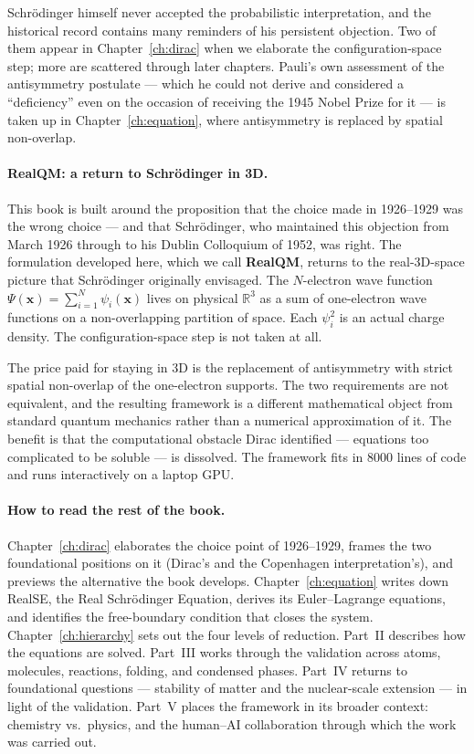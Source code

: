 Schr\"odinger himself never accepted the probabilistic interpretation, and the historical record contains many reminders of his persistent objection. Two of them appear in Chapter~\ref{ch:dirac} when we elaborate the configuration-space step; more are scattered through later chapters. Pauli's own assessment of the antisymmetry postulate --- which he could not derive and considered a ``deficiency'' even on the occasion of receiving the 1945 Nobel Prize for it --- is taken up in Chapter~\ref{ch:equation}, where antisymmetry is replaced by spatial non-overlap.

\paragraph{RealQM: a return to Schr\"odinger in 3D.}
This book is built around the proposition that the choice made in 1926--1929 was the wrong choice --- and that Schr\"odinger, who maintained this objection from March 1926 through to his Dublin Colloquium of 1952, was right. The formulation developed here, which we call \textbf{RealQM}, returns to the real-3D-space picture that Schr\"odinger originally envisaged. The $N$-electron wave function $\Psi(\mathbf{x}) = \sum_{i=1}^N \psi_i(\mathbf{x})$ lives on physical $\mathbb{R}^3$ as a sum of one-electron wave functions on a non-overlapping partition of space. Each $\psi_i^2$ is an actual charge density. The configuration-space step is not taken at all.

The price paid for staying in 3D is the replacement of antisymmetry with strict spatial non-overlap of the one-electron supports. The two requirements are not equivalent, and the resulting framework is a different mathematical object from standard quantum mechanics rather than a numerical approximation of it. The benefit is that the computational obstacle Dirac identified --- equations too complicated to be soluble --- is dissolved. The framework fits in 8000 lines of code and runs interactively on a laptop GPU.

\paragraph{How to read the rest of the book.}
Chapter~\ref{ch:dirac} elaborates the choice point of 1926--1929, frames the two foundational positions on it (Dirac's and the Copenhagen interpretation's), and previews the alternative the book develops. Chapter~\ref{ch:equation} writes down RealSE, the Real Schr\"odinger Equation, derives its Euler--Lagrange equations, and identifies the free-boundary condition that closes the system. Chapter~\ref{ch:hierarchy} sets out the four levels of reduction. Part~II describes how the equations are solved. Part~III works through the validation across atoms, molecules, reactions, folding, and condensed phases. Part~IV returns to foundational questions --- stability of matter and the nuclear-scale extension --- in light of the validation. Part~V places the framework in its broader context: chemistry vs.\ physics, and the human--AI collaboration through which the work was carried out.

